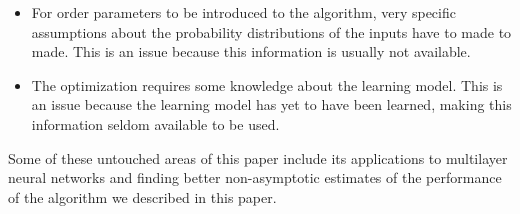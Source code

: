 																																																																																																																																																																																																																						     \begin{itemize}
																																																																																																																																																																																																																							         \item For order parameters to be introduced to the algorithm, very specific assumptions about the probability distributions of the inputs have to made to made. This is an issue because this information is usually not available.
																																																																																																																																																																																																																									         \item The optimization requires some knowledge about the learning model. This is an issue because the learning model has yet to have been learned, making this information seldom available to be used.  
																																																																																																																																																																																																																											     \end{itemize}
																																																																																																																																																																																																																												     
																																																																																																																																																																																																																													     \noindent Some of these untouched areas of this paper include its applications to multilayer neural networks and finding better non-asymptotic estimates of the performance of the algorithm we described in this paper. \vspace{4mm}
																																																																																																																																																																																																																														     

